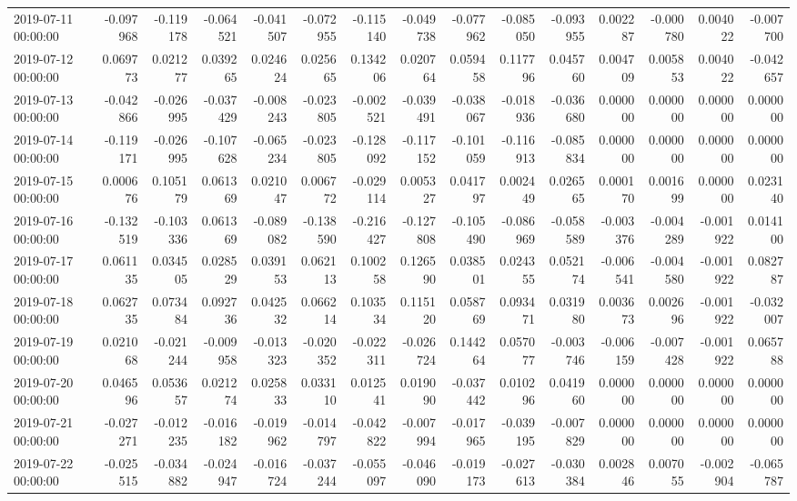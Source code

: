 \begin{tabular}{lrrrrrrrrrrrrrr}
2019-07-11 00:00:00 & -0.097968 & -0.119178 & -0.064521 & -0.041507 & -0.072955 & -0.115140 & -0.049738 & -0.077962 & -0.085050 & -0.093955 & 0.002287 & -0.000780 & 0.004022 & -0.007700 \\
2019-07-12 00:00:00 & 0.069773 & 0.021277 & 0.039265 & 0.024624 & 0.025665 & 0.134206 & 0.020764 & 0.059458 & 0.117796 & 0.045760 & 0.004709 & 0.005853 & 0.004022 & -0.042657 \\
2019-07-13 00:00:00 & -0.042866 & -0.026995 & -0.037429 & -0.008243 & -0.023805 & -0.002521 & -0.039491 & -0.038067 & -0.018936 & -0.036680 & 0.000000 & 0.000000 & 0.000000 & 0.000000 \\
2019-07-14 00:00:00 & -0.119171 & -0.026995 & -0.107628 & -0.065234 & -0.023805 & -0.128092 & -0.117152 & -0.101059 & -0.116913 & -0.085834 & 0.000000 & 0.000000 & 0.000000 & 0.000000 \\
2019-07-15 00:00:00 & 0.000676 & 0.105179 & 0.061369 & 0.021047 & 0.006772 & -0.029114 & 0.005327 & 0.041797 & 0.002449 & 0.026565 & 0.000170 & 0.001699 & 0.000000 & 0.023140 \\
2019-07-16 00:00:00 & -0.132519 & -0.103336 & 0.061369 & -0.089082 & -0.138590 & -0.216427 & -0.127808 & -0.105490 & -0.086969 & -0.058589 & -0.003376 & -0.004289 & -0.001922 & 0.014100 \\
2019-07-17 00:00:00 & 0.061135 & 0.034505 & 0.028529 & 0.039153 & 0.062113 & 0.100258 & 0.126590 & 0.038501 & 0.024355 & 0.052174 & -0.006541 & -0.004580 & -0.001922 & 0.082787 \\
2019-07-18 00:00:00 & 0.062735 & 0.073484 & 0.092736 & 0.042532 & 0.066214 & 0.103534 & 0.115120 & 0.058769 & 0.093471 & 0.031980 & 0.003673 & 0.002696 & -0.001922 & -0.032007 \\
2019-07-19 00:00:00 & 0.021068 & -0.021244 & -0.009958 & -0.013323 & -0.020352 & -0.022311 & -0.026724 & 0.144264 & 0.057077 & -0.003746 & -0.006159 & -0.007428 & -0.001922 & 0.065788 \\
2019-07-20 00:00:00 & 0.046596 & 0.053657 & 0.021274 & 0.025833 & 0.033110 & 0.012541 & 0.019090 & -0.037442 & 0.010296 & 0.041960 & 0.000000 & 0.000000 & 0.000000 & 0.000000 \\
2019-07-21 00:00:00 & -0.027271 & -0.012235 & -0.016182 & -0.019962 & -0.014797 & -0.042822 & -0.007994 & -0.017965 & -0.039195 & -0.007829 & 0.000000 & 0.000000 & 0.000000 & 0.000000 \\
2019-07-22 00:00:00 & -0.025515 & -0.034882 & -0.024947 & -0.016724 & -0.037244 & -0.055097 & -0.046090 & -0.019173 & -0.027613 & -0.030384 & 0.002846 & 0.007055 & -0.002904 & -0.065787 \\

\end{tabular}
